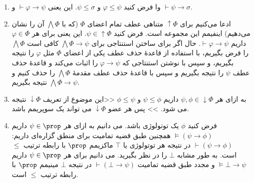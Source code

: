 \begin{ans}
    \begin{enumerate}[label=(\alph*)]
        \item 
        وا
        فرض کنید
        $\varphi\leq\psi$
        و
        $\psi\leq\sigma$.
        این یعنی
        $\vdash\varphi\to\psi$
        و
        $\vdash\psi\to\sigma$.
        \item ادعا می‌کنیم برای
        $\uparrow\Phi$
        متناهی عطف تمام اعضای
        $\Phi$
        (که با
        $\bigwedge\Phi$
        آن را نشان می‌دهیم)
        اینفیمم این مجموعه است.
        فرض کنید
        $\psi\in\uparrow\Phi$.
        این یعنی برای هر
        $\varphi\in\Phi$
        داریم
        $\vdash\varphi\to\psi$.
        حال اگر برای ساختن استنتاجی برای
        $\bigwedge\Phi\to\psi$
        کافی است
        $\bigwedge\Phi$
        را فرض بگیریم، با استفاده از قاعدهٔ حذف عطف یکی از اعضای
        $\Phi$
        مثل
        $\varphi$
        را نتیجه بگیریم، و سپس با نوشتن استنتاجی که
        $\varphi\to\psi$
        را اثبات می‌کند و قاعدهٔ حذف عطف
        $\psi$
        را نتیجه بگیریم و سپس با قاعدهٔ حذف عطف مقدمهٔ
        $\bigwedge\Phi$
        را حذف کنیم و نتیجه بگیریم
        $\bigwedge\Phi\to\psi$.
        
        \item 
        به ازای هر 
        $\psi,\phi\in\downarrow\Phi$
        داریم
        $\psi\leq\phi$
        و
        $\phi\leq\psi$
        <<این موضوع از تعریف 
        $\downarrow\Phi$
        نتیجه می شود. >>
        پس هر عضو 
        $\downarrow\Phi$
        می تواند یک سوپریمم باشد.
        \item  
        فرض کنید 
        $\phi$
        یک توتولوژی باشد. 
        می دانیم به ازای هر 
        $\psi\in\prop$
        داریم
        $\models(\psi\to\phi)$
        همچنین طبق قضیه تمامیت برای منطق گزاره‌ای داریم:
        $\vdash(\psi\to\phi)$
        در نتیجه هر توتولوژی یا
        $\top$
        ماکزیمم 
        $\prop$
        با رابطه ترتیب 
        $\leq$
        است.
        به طور مشابه 
        $\bot$
        را در نظر بگیرید. 
        می دانیم برای هر 
        $\psi\in\prop$
        داریم 
        $\models\bot\to\psi$
        و مجدد طبق قضیه تمامیت
        $\vdash(\bot\to\psi)$
        در نتیجه 
        $\bot$
        مینیمم 
        $\prop$
        با رابطه ترتیب
        $\leq$
        است.


\end{enumerate}
\end{ans}
